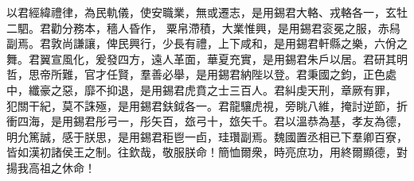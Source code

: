 \begin{pinyinscope}
以君經緯禮律，為民軌儀，使安職業，無或遷志，是用錫君大輅、戎輅各一，玄牡二駟。君勸分務本，穡人昏作，
粟帛滯積，大業惟興，是用錫君衮冕之服，赤舄副焉。君敦尚謙讓，俾民興行，少長有禮，上下咸和，是用錫君軒縣之樂，六佾之舞。君翼宣風化，爰發四方，遠人革面，華夏充實，是用錫君朱戶以居。君研其明哲，思帝所難，官才任賢，羣善必舉，是用錫君納陛以登。君秉國之鈞，正色處中，纖豪之惡，靡不抑退，是用錫君虎賁之士三百人。君糾虔天刑，章厥有罪，
犯關干紀，莫不誅殛，是用錫君鈇鉞各一。君龍驤虎視，旁眺八維，掩討逆節，折衝四海，是用錫君彤弓一，彤矢百，玈弓十，玈矢千。君以溫恭為基，孝友為德，明允篤誠，感于朕思，是用錫君秬鬯一卣，珪瓚副焉。魏國置丞相已下羣卿百寮，皆如漢初諸侯王之制。往欽哉，敬服朕命！簡恤爾衆，時亮庶功，用終爾顯德，對揚我高祖之休命！

\end{pinyinscope}
